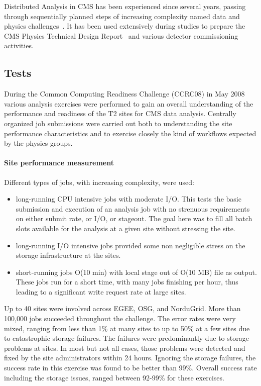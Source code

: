 Distributed Analysis in CMS has been experienced since several years, passing through sequentially planned steps of increasing complexity named data and physics challenges~\cite{RefPastExp}.
It has been used extensively during studies to prepare the CMS Physics Technical Design Report~\cite{PTDR} and various detector commissioning activities. 

\subsection{Tests}
\label{sec:5_1}
During the Common Computing Readiness Challenge (CCRC08) in May 2008
various analysis exercises were performed to gain an overall understanding 
of the performance and readiness of the T2 sites for CMS data analysis.
Centrally organized job submissions were carried out both to understanding the site performance characteristics and to exercise closely the kind of workflows
expected by the physics groups.
\paragraph{Site performance measurement}
Different types of jobs, with increasing complexity, were used:
\begin{itemize}
\item long-running CPU intensive jobs with moderate I/O. This tests the basic submission and execution of an analysis job with no strenuous requirements on 
either submit rate, or I/O, or stageout. The goal here was to fill all batch slots available for the analysis at a given site without stressing the site.
\item long-running I/O intensive jobs provided some non negligible stress on 
the storage infrastructure at the sites.
\item short-running jobs O(10 min) with local stage out of O(10 MB) file as output. These jobs run for a short time, with many jobs finishing per hour, thus leading to a significant write request rate at large sites.
\end{itemize}
Up to 40 sites were involved across EGEE, OSG, and NorduGrid. More than 100,000 jobs succeeded throughout the challenge. The error rates were very mixed, ranging from less than 1\% at many sites to up to 50\% at a few sites due to
catastrophic storage failures. The failures were predominantly
due to storage problems at sites. In most but not all cases, those problems were detected and fixed by the site administrators within 24 hours. Ignoring the storage failures, the success rate in this exercise was found to be better than 99\%. Overall success rate including the storage issues, ranged between 92-99\% for these exercises.

